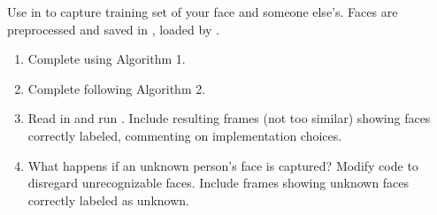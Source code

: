 \documentclass[11pt]{article}
\begin{document}
Use  in  to capture
training set of your face and someone else's. Faces are preprocessed and saved in
, loaded by .

\begin{questionbox}
\begin{enumerate}[leftmargin=*]
	\item Complete  using Algorithm 1.
	\item Complete  following Algorithm 2.
	\item Read  in  and run .
	Include resulting frames (not too similar) showing faces correctly labeled,
	commenting on implementation choices.
	\item What happens if an unknown person's face is captured?
	Modify code to disregard unrecognizable faces.
	Include frames showing unknown faces correctly labeled as unknown.
\end{enumerate}
\end{questionbox}



\end{document}
